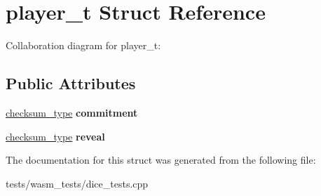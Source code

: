 \hypertarget{structplayer__t}{}\section{player\+\_\+t Struct Reference}
\label{structplayer__t}


Collaboration diagram for player\+\_\+t\+:
\subsection*{Public Attributes}
\begin{DoxyCompactItemize}
\item 
\mbox{\label{structplayer__t_ac899507124c1e80df674c60692e32999}} 
\mbox{\hyperlink{classfc_1_1sha256}{checksum\+\_\+type}} {\bfseries commitment}
\item 
\mbox{\label{structplayer__t_a3319546b88e91c786d8a82ecec62f604}} 
\mbox{\hyperlink{classfc_1_1sha256}{checksum\+\_\+type}} {\bfseries reveal}
\end{DoxyCompactItemize}


The documentation for this struct was generated from the following file\+:\begin{DoxyCompactItemize}
\item 
tests/wasm\+\_\+tests/dice\+\_\+tests.\+cpp\end{DoxyCompactItemize}
